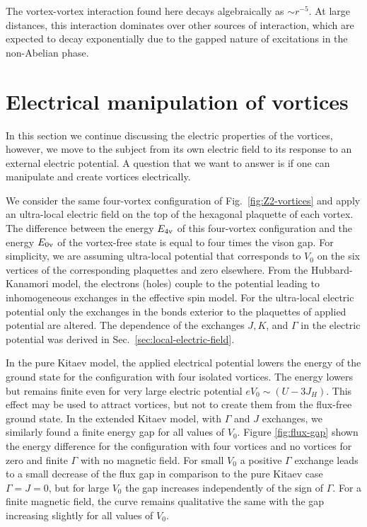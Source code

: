 The vortex-vortex interaction found here decays algebraically as $\sim r^{-5}$. At large distances, this interaction dominates over other sources of interaction,  which are expected to decay exponentially \cite{Lahtinen2012} due to the gapped nature of excitations in the non-Abelian phase.








\section{Electrical manipulation of vortices}

In this section we continue discussing the electric properties of the vortices, however, we move to the subject from its own electric field to its response to an external electric potential.
A question that we want to answer is if one can manipulate and create vortices electrically.

We consider the same four-vortex configuration of Fig.~\ref{fig:Z2-vortices} and apply an ultra-local electric field on the top of the hexagonal plaquette of each vortex.
The difference between the energy  $E_{4\rm v}$   of this four-vortex configuration and the energy $E_{0\rm v}$  of the vortex-free state is equal to four times the vison gap.
For simplicity, we are assuming ultra-local potential that corresponds to $V_0$ on the six vertices of the corresponding plaquettes and zero elsewhere. From the Hubbard-Kanamori model, the electrons (holes) couple to the potential leading to inhomogeneous exchanges in the effective spin model. For the ultra-local electric potential only the exchanges in the bonds exterior to the plaquettes of applied potential are altered.
The dependence of the exchanges $J, K$, and $\Gamma$ in the electric potential was derived in Sec.~\ref{sec:local-electric-field}.


In the pure Kitaev model, the applied electrical potential lowers the energy of the ground state for the configuration with four isolated vortices. The energy lowers but remains finite even for very large electric potential $e V_0 \sim (U- 3 J_H)$. This effect may be used to attract vortices, but not to create them from the flux-free ground state.
In the extended Kitaev model, with $\Gamma$ and $J$ exchanges, we similarly found a finite energy gap for all values of $V_0$. Figure \ref{fig:flux-gap}  shown the energy difference for the configuration with four vortices and no vortices for zero and finite $\Gamma$ with no magnetic field. For small $V_0$ a positive $\Gamma$ exchange leads to a small decrease of the flux gap in comparison to the pure Kitaev case $\Gamma=J=0$, but for large $V_0$ the gap increases independently of the sign of $\Gamma$.
For a finite magnetic field, the curve remains qualitative the same with the gap increasing slightly for all values of $V_0$.

